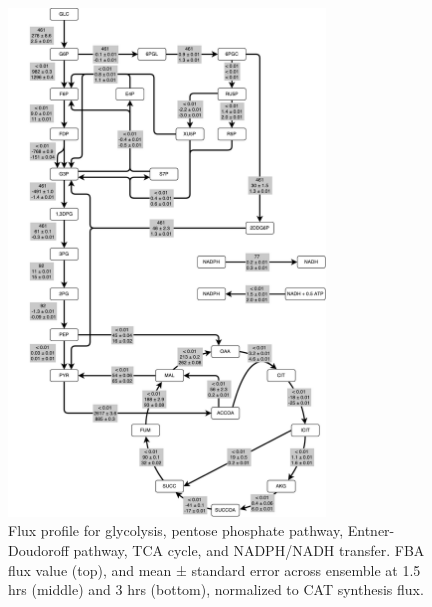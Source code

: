 \documentclass[12pt]{article}
\begin{document}
\begin{figure}[ht]
\centering
\includegraphics[width=0.75\textwidth]{./Figures/Network.pdf}
\caption{Flux profile for glycolysis, pentose phosphate pathway, Entner-Doudoroff pathway, TCA cycle, and NADPH/NADH transfer. FBA flux value (top), and mean ± standard error across ensemble at 1.5 hrs (middle) and 3 hrs (bottom), normalized to CAT synthesis flux.}
\label{fig:Network}
\end{figure}
\end{document}
